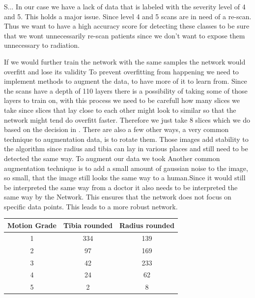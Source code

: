 \documentclass[
a4paper, 
12pt,
grayscalebody, %
abstract=on,
twoside, BCOR10mm, 12pt, DIV13,headinclude, footexclude, final, abstracton, openright
]{ibireprt}
\numberwithin{equation}{chapter}
\numberwithin{table}{chapter}
\numberwithin{figure}{chapter}
\numberwithin{algorithm}{chapter}
\numberwithin{example}{chapter}
\numberwithin{example}{chapter}
\begin{document}
  S... In our case we have a lack of data that is labeled with the severity level of 4 and 5. This holds a major issue. Since level 4 and 5 scans are in need of a re-scan. Thus we want to have a high accuracy score for detecting these classes to be sure that we wont unnecessarily re-scan patients since we don't want to expose them unnecessary to radiation.%
 
 If we would further train the network with the same samples the network would overfitt and lose its validity  To prevent overfitting from happening we need to implement methods to augment the data, to have more of it to learn from. Since the scans have a depth of 110 layers there is a possibility of taking some of those layers to train on, with this process we need to be carefull how many slices we take since slices that lay close to each other might look to similar so that the network might tend do overfitt faster. Therefore we just take 8 slices which we do based on the decision in \cite{Walle2023}.%
  There are also a few other ways, a very common technique to augmentation data, is to rotate them. Those images add stability to the algorithm since radius and tibia can lay in various places and still need to be detected the same way. To augment our data we took %
Another common augmentation technique is to add  a small amount of gaussian noise to the image, so small, that the image still looks the same way to a human.Since it would still be interpreted the same way from a doctor it also needs to be interpreted the same way by the Network. This ensures that the network does not focus on specific data points. This leads to a more robust network.




\begin{center}
	\begin{tabular}{||c|c|c||}
		
		 Motion Grade&  Tibia rounded& Radius rounded  	\\
		\hline
		\hline
		1 &  334&  139   \\
		\hline
		2 &  97&  169 	\\
		\hline
		3 &  42&  233   \\
		\hline
		4 &  24&  62   \\
		\hline
		5 &  2&  8 \\
		\hline
	\end{tabular}
\end{center}
\end{document}
